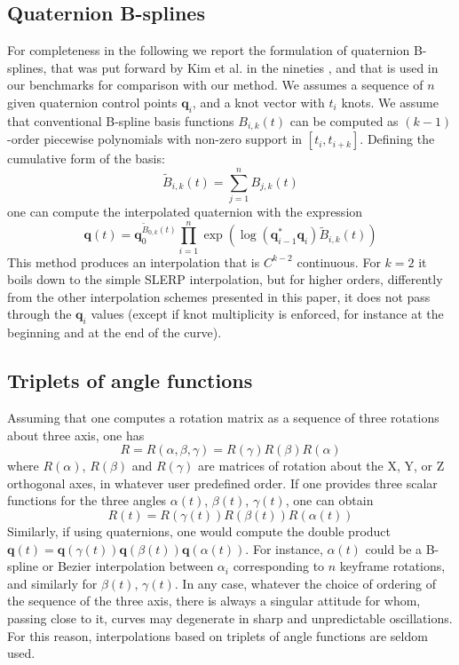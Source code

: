 \documentclass[preprint, 12pt]{elsarticle}
\def\quat#1{{\boldsymbol{#1}}}
\begin{document}
\subsection{Quaternion B-splines}
For completeness in the following we report the formulation of quaternion B-splines, that was put forward by Kim et al. in the nineties \cite{kim1995ac}, and that is used in our benchmarks for comparison with our method. 
We assumes a sequence of $n$ given quaternion control points $\quat{q}_i$, and a knot vector with $t_i$ knots. We assume that conventional B-spline basis functions $B_{i,k}(t)$ can be computed as $(k-1)$-order piecewise polynomials with non-zero support in $[t_i,t_{i+k}]$. Defining the cumulative form of the basis:
\begin{equation}
    \tilde{B}_{i,k}(t) = \sum_{j=1}^{n} B_{j,k}(t)  
\end{equation}
one can compute the interpolated quaternion with the expression
\begin{equation}
    \quat{q}(t) = \quat{q}_0^{\tilde{B}_{0,k}(t)} \prod_{i=1}^{n} \exp \left( \log(\quat{q}_{i-1}^* \quat{q}_i) \tilde{B}_{i,k}(t) \right)
\end{equation}
This method produces an interpolation that is $C^{k-2}$ continuous. For $k=2$ it boils down to the simple SLERP interpolation, but for higher orders, differently from the other interpolation schemes presented in this paper, it does not pass through the $\quat{q}_i$ values (except if knot multiplicity is enforced, for instance at the beginning and at the end of the curve).

\subsection{Triplets of angle functions}
Assuming that one computes a rotation matrix as a sequence of three rotations about three axis, one has
\begin{equation}
    R = R(\alpha,\beta,\gamma) = R(\gamma) R(\beta) R(\alpha)
\end{equation}
where $R(\alpha)$, $R(\beta)$ and $R(\gamma)$ are matrices of rotation about the X, Y, or Z orthogonal axes, in whatever user predefined order. 
If one provides three scalar functions for the three angles $\alpha(t)$, $\beta(t)$, $\gamma(t)$, one can obtain 
\begin{equation}
    R(t) = R(\gamma(t)) R(\beta(t)) R(\alpha(t))
\end{equation}
Similarly, if using quaternions, one would compute the double product
$\quat{q}(t)=\quat{q}(\gamma(t))\quat{q}(\beta(t))\quat{q}(\alpha(t))$. For instance, $\alpha(t)$ could be a B-spline or Bezier interpolation between $\alpha_i$ corresponding to $n$ keyframe rotations, and similarly for $\beta(t)$, $\gamma(t)$.
In any case, whatever the choice of ordering of the sequence of the three axis, there is always a singular attitude for whom, passing close to it, curves may degenerate in sharp and unpredictable oscillations. For this reason, interpolations based on triplets of angle functions are seldom used. 
\end{document}
